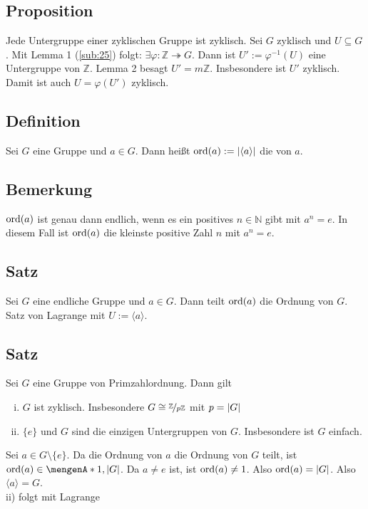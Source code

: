 \subsection[Proposition: Jede Untergruppe einer zyklischen Gruppe ist zyklisch]{Proposition} %
\label{sub:29}
Jede Untergruppe einer zyklischen Gruppe ist zyklisch.
Sei $G$ zyklisch und $U \subseteq G$. Mit Lemma 1 (\ref{sub:25}) folgt: $\exists \varphi : \mathds{Z} \twoheadrightarrow G$. Dann ist $U' := \varphi ^{-1}(U)$ eine Untergruppe von $\mathds{Z}$. Lemma
2 besagt $U'= m \mathds{Z}$. Insbesondere ist $U'$ zyklisch. Damit ist auch $U = \varphi(U')$ zyklisch. \bewende

\subsection[Definition: Ordnung eines Gruppenelements]{Definition} %
\label{sub:210}
Sei $G$ eine Gruppe und $a \in G$. Dann heißt $\ord(a) := \abs{\langle a\rangle} $ die  von $a$.

\subsection[Bemerkung, wann $\ord(a)$ endlich ist]{Bemerkung} %
\label{sub:211}
$\ord (a)$ ist genau dann endlich, wenn es ein positives $n \in \mathds{N}$ gibt mit $a^n = e$. In diesem Fall ist $\ord (a)$ die kleinste positive Zahl $n$ mit $a^n=e$.

\subsection[Satz: Ordnung der Gruppen wird von $\ord(a)$ geteilt]{Satz} %
\label{sub:212}
Sei $G$ eine endliche Gruppe und $a \in G$. Dann teilt $\ord(a)$ die Ordnung von $G$.
Satz von Lagrange mit $U:= \langle a\rangle$. \bewende

\subsection[Satz über Gruppen von Primzahlordnung]{Satz} %
\label{sub:213}
Sei $G$ eine Gruppe von Primzahlordnung. Dann gilt
\begin{enumerate}[i)]
	\item $G$ ist zyklisch. Insbesondere $G \cong \nicefrac{\mathds{Z}}{p \mathds{Z}}$ mit $p = \abs{G} $
	\item $\{e\}$ und $G$ sind die einzigen Untergruppen von $G$. Insbesondere ist $G$ einfach.
\end{enumerate}
Sei $a \in G \setminus \{e\}$. Da die Ordnung von $a$ die Ordnung von $G$ teilt, ist $\ord(a) \in \set{1, \abs{G} } $. Da $a \not= e$ ist, ist $\ord(a) \not=1$. Also 
$\ord(a)= \abs{G} $. Also $\langle a\rangle =G$.\\
ii) folgt mit Lagrange \bewende
\newpage

